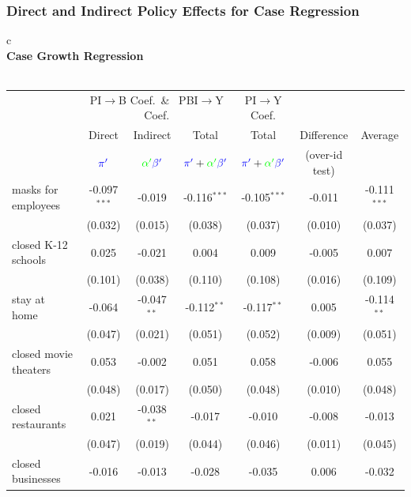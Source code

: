 \documentclass{beamer}
\def\bcolor{\color{green}}
\def\pcolor{\color{blue}}
\renewcommand{\to}{{\rightarrow}}
\begin{document}

\begin{frame}
  \frametitle{Direct and Indirect Policy Effects for Case Regression}

\begin{table}
\begin{minipage}{\linewidth}
  \centering
    \tiny
  \begin{tabular}{c}
%    
      \\
    \textbf{{\normalsize Case Growth Regression}}
    \\
    \\
\begin{tabular}{lccc|c|cc}
\toprule
&\multicolumn{3}{c|}{ PI$\to$B Coef.\ \& \ PBI$\to$Y Coef.  } &PI$\to$Y Coef.  \\
  & Direct & Indirect & Total & Total  & Difference & Average\\\
  &${\pcolor\pi'}$&${\bcolor\alpha '}  {\pcolor \beta' }$ &${\pcolor\pi'}+{\bcolor\alpha '}  {\pcolor \beta' }$ &${\pcolor\pi'}+{\bcolor\alpha '}  {\pcolor \beta' }$ & (over-id test)  \\
\midrule
masks for employees & -0.097$^{***}$ & -0.019 & -0.116$^{***}$ & -0.105$^{***}$ & -0.011 & -0.111$^{***}$\\
 & (0.032) & (0.015) & (0.038) & (0.037) & (0.010) & (0.037)\\
closed K-12 schools & 0.025 & -0.021 & 0.004 & 0.009 & -0.005 & 0.007\\
 & (0.101) & (0.038) & (0.110) & (0.108) & (0.016) & (0.109)\\
stay at home & -0.064 & -0.047$^{**}$ & -0.112$^{**}$ & -0.117$^{**}$ & 0.005 & -0.114$^{**}$\\
 & (0.047) & (0.021) & (0.051) & (0.052) & (0.009) & (0.051)\\
closed movie theaters & 0.053 & -0.002 & 0.051 & 0.058 & -0.006 & 0.055\\
 & (0.048) & (0.017) & (0.050) & (0.048) & (0.010) & (0.048)\\
closed restaurants & 0.021 & -0.038$^{**}$ & -0.017 & -0.010 & -0.008 & -0.013\\
 & (0.047) & (0.019) & (0.044) & (0.046) & (0.011) & (0.045)\\
closed businesses & -0.016 & -0.013 & -0.028 & -0.035 & 0.006 & -0.032\\

\end{tabular}
\end{tabular}
\end{minipage}
\end{table}
\end{frame}
\end{document}
